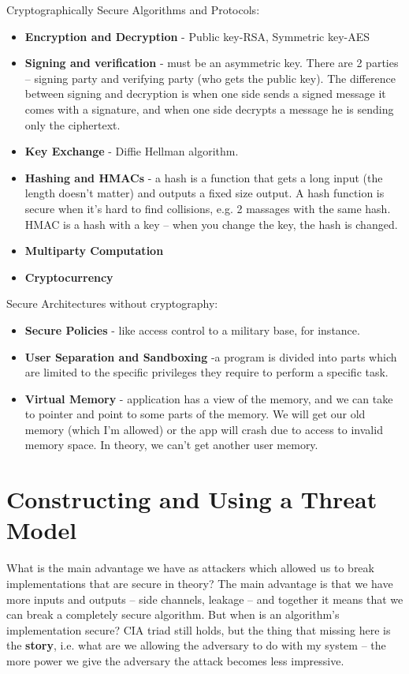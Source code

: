 Cryptographically Secure Algorithms and Protocols:
\begin{itemize}
\item \textbf{Encryption and Decryption} - Public key-RSA, Symmetric key-AES
\item \textbf{Signing and verification} - must be an asymmetric key. There are 2 parties – signing party and verifying party (who gets the public key). The difference between signing and decryption is when one side sends a signed message it comes with a signature, and when one side decrypts a message he is sending only the ciphertext.
\item \textbf{Key Exchange} - Diffie Hellman algorithm.
\item \textbf{Hashing and HMACs} - a hash is a function that gets a long input (the length doesn’t matter) and outputs a fixed size output. A hash function is secure when it’s hard to find collisions, e.g. 2 massages with the same hash. HMAC is a hash with a key – when you change the key, the hash is changed.
\item \textbf{Multiparty Computation}
\item \textbf{Cryptocurrency}
\end{itemize}

Secure Architectures without cryptography:
\begin{itemize}
\item \textbf{Secure Policies} - like access control to a military base, for instance.
\item \textbf{User Separation and Sandboxing} -a program is divided into parts which are limited to the specific privileges they require to perform a specific task.
\item \textbf{Virtual Memory} - application has a view of the memory, and we can take to pointer and point to some parts of the memory. We will get our old memory (which I’m allowed) or the app will crash due to access to invalid memory space. In theory, we can’t get another user memory.
\end{itemize}

\section{Constructing and Using a Threat Model}
\label{sec:BreakImpl}

What is the main advantage we have as attackers which allowed us to break implementations that are secure in theory?
The main advantage is that we have more inputs and outputs – side channels, leakage – and together it means that we can break a completely secure algorithm. 
But when is an algorithm’s implementation secure? CIA triad still holds, but the thing that missing here is the \textbf{story}, i.e. what are we allowing the adversary to do with my system – the more power we give the adversary the attack becomes less impressive. 

